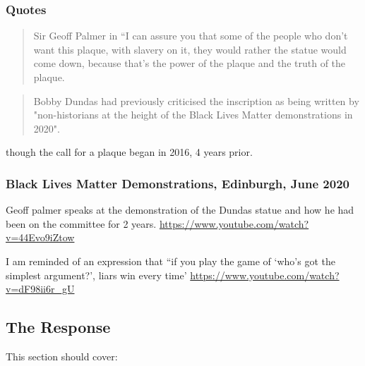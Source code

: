 \documentclass{scrartcl}
\begin{document}
\subsubsection{Quotes}
\begin{quotation}{Sir Geoff Palmer in \cite{anderson_2021}}
    “I can assure you that some of the people who don’t want this plaque, with slavery on it, they would rather the statue would come down, because that’s the power of the plaque and the truth of the plaque.
\end{quotation}
\begin{quote}
    Bobby Dundas had previously criticised the inscription as being written by "non-historians at the height of the Black Lives Matter demonstrations in 2020".
\end{quote}\cite{bbc_2024} though the call for a plaque began in 2016, 4 years prior.

\subsubsection{Black Lives Matter Demonstrations, Edinburgh, June 2020}

Geoff palmer speaks at the demonstration of the Dundas statue and how he had been on the committee for 2 years. \url{https://www.youtube.com/watch?v=44Evo9iZtow}

I am reminded of an expression that ``if you play the game of `who's got the simplest argument?', liars win every time' \url{https://www.youtube.com/watch?v=dF98ii6r_gU}

\subsection{The Response}

This section should cover:
\end{document}
